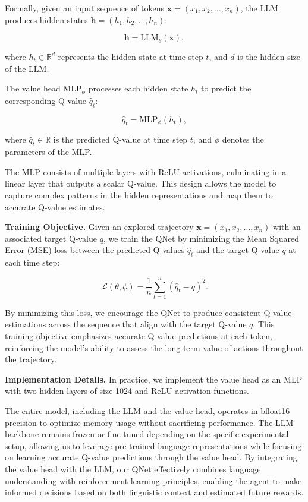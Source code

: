 Formally, given an input sequence of tokens $\mathbf{x} = (x_1, x_2, \dots, x_n)$, the LLM produces hidden states $\mathbf{h} = (h_1, h_2, \dots, h_n)$:

\begin{equation}
\mathbf{h} = \text{LLM}_\theta(\mathbf{x}),
\end{equation}

where $h_t \in \mathbb{R}^d$ represents the hidden state at time step $t$, and $d$ is the hidden size of the LLM.

The value head $\text{MLP}_\phi$ processes each hidden state $h_t$ to predict the corresponding Q-value $\hat{q}_t$:

\begin{equation}
\hat{q}_t = \text{MLP}_\phi(h_t),
\end{equation}

where $\hat{q}_t \in \mathbb{R}$ is the predicted Q-value at time step $t$, and $\phi$ denotes the parameters of the MLP.

The MLP consists of multiple layers with ReLU activations, culminating in a linear layer that outputs a scalar Q-value. This design allows the model to capture complex patterns in the hidden representations and map them to accurate Q-value estimates.

\textbf{Training Objective.}
Given an explored trajectory $\mathbf{x} = (x_1, x_2, \dots, x_n)$ with an associated target Q-value $q$, we train the QNet by minimizing the Mean Squared Error (MSE) loss between the predicted Q-values $\hat{q}_t$ and the target Q-value $q$ at each time step:

\begin{equation}
\mathcal{L}(\theta, \phi) = \frac{1}{n} \sum_{t=1}^{n} \left( \hat{q}_t - q \right)^2.
\end{equation}

By minimizing this loss, we encourage the QNet to produce consistent Q-value estimations across the sequence that align with the target Q-value $q$. This training objective emphasizes accurate Q-value predictions at each token, reinforcing the model's ability to assess the long-term value of actions throughout the trajectory.

\textbf{Implementation Details.}
In practice, we implement the value head as an MLP with two hidden layers of size 1024 and ReLU activation functions.


The entire model, including the LLM and the value head, operates in bfloat16 precision to optimize memory usage without sacrificing performance. The LLM backbone remains frozen or fine-tuned depending on the specific experimental setup, allowing us to leverage pre-trained language representations while focusing on learning accurate Q-value predictions through the value head. By integrating the value head with the LLM, our QNet effectively combines language understanding with reinforcement learning principles, enabling the agent to make informed decisions based on both linguistic context and estimated future rewards.

